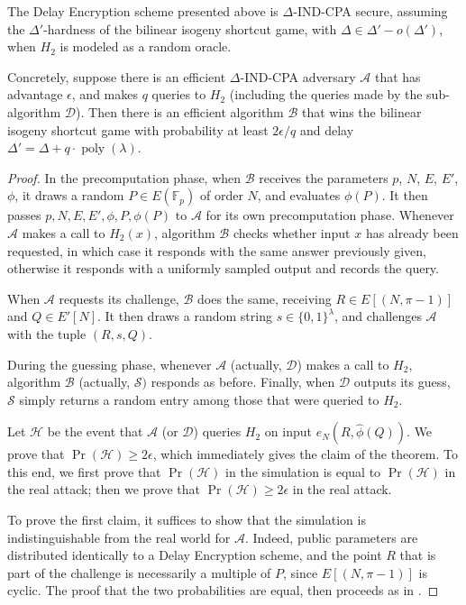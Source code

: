 \documentclass{llncs}
\newcommand{\F}{\mathbb{F}}
\DeclareMathOperator{\poly}{poly}
\begin{document}
\begin{theorem}
  The Delay Encryption scheme presented above is $\Delta$-IND-CPA
  secure, assuming the $\Delta'$-hardness of the bilinear isogeny
  shortcut game, with $\Delta\in\Delta' - o(\Delta')$, when $H_2$ is
  modeled as a random oracle.

  Concretely, suppose there is an efficient $\Delta$-IND-CPA adversary
  $\mathcal{A}$ that has advantage $\epsilon$, and makes $q$ queries
  to $H_2$ (including the queries made by the sub-algorithm
  $\mathcal{D}$). Then there is an efficient algorithm $\mathcal{B}$
  that wins the bilinear isogeny shortcut game with probability at
  least $2\epsilon/q$ and delay $\Delta' = \Delta + q\cdot\poly(\lambda)$.
\end{theorem}
\begin{proof}
  In the precomputation phase, when $\mathcal{B}$ receives the
  parameters $p$, $N$, $E$, $E'$, $\phi$, it draws a random $P\in E(\F_p)$ of
  order $N$, and evaluates $\phi(P)$. %
  It then passes $p,N,E,E',\phi,P,\phi(P)$ to $\mathcal{A}$ for its
  own precomputation phase. %
  Whenever $\mathcal{A}$ makes a call to $H_2(x)$, algorithm
  $\mathcal{B}$ checks whether input $x$ has already been requested,
  in which case it responds with the same answer previously given,
  otherwise it responds with a uniformly sampled output and records
  the query.

  When $\mathcal{A}$ requests its challenge, $\mathcal{B}$ does the
  same, receiving $R\in E[(N,\pi-1)]$ and $Q\in E'[N]$. %
  It then draws a random string $s\in\{0,1\}^\lambda$, and challenges
  $\mathcal{A}$ with the tuple $(R,s,Q)$.

  During the guessing phase, whenever $\mathcal{A}$ (actually,
  $\mathcal{D}$) makes a call to $H_2$, algorithm $\mathcal{B}$
  (actually, $\mathcal{S})$ responds as before. %
  Finally, when $\mathcal{D}$ outputs its guess, $\mathcal{S}$ simply
  returns a random entry among those that were queried to $H_2$.

  Let $\mathcal{H}$ be the event that $\mathcal{A}$ (or $\mathcal{D}$)
  queries $H_2$ on input $e_N(R,\hat\phi(Q))$. %
  We prove that $\Pr(\mathcal{H}) \ge 2\epsilon$, which immediately
  gives the claim of the theorem. %
  To this end, we first prove that $\Pr(\mathcal{H})$ in the
  simulation is equal to $\Pr(\mathcal{H})$ in the real attack; then
  we prove that $\Pr(\mathcal{H})\ge 2\epsilon$ in the real attack.

  To prove the first claim, it suffices to show that the simulation is
  indistinguishable from the real world for $\mathcal{A}$. %
  Indeed, public parameters are distributed identically to a Delay
  Encryption scheme, and the point $R$ that is part of the challenge
  is necessarily a multiple of $P$, since $E[(N,\pi-1)]$ is cyclic. %
  The proof that the two probabilities are equal, then proceeds as in
  \cite[Lemma~4.3, Claim~1]{doi:10.1137/S0097539701398521}.


\end{proof}
\end{document}

